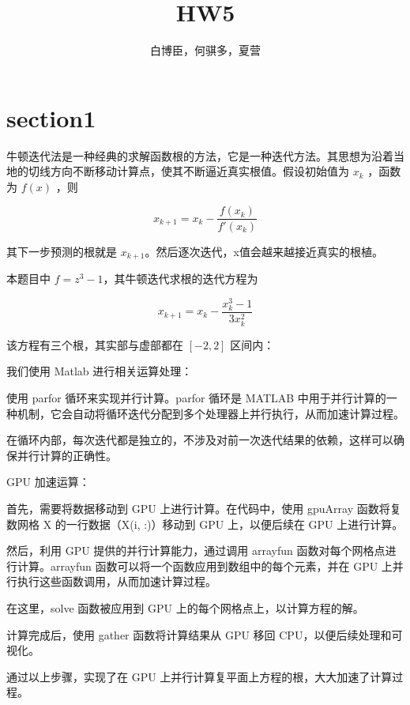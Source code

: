 \documentclass[UTF8]{ctexart}
\begin{document}
    \title{\textbf{HW5}}
    \author{白博臣，何骐多，夏营}
    \date{}
    \maketitle

    \section{section1}\label{sec:section1}
    牛顿迭代法是一种经典的求解函数根的方法，它是一种迭代方法。其思想为沿着当地的切线方向不断移动计算点，使其不断逼近真实根值。假设初始值为 \(x_k\) ，函数为 \(f(x)\) ，则

    \begin{equation*}
        x_{k+1}=x_k-\frac{f(x_k)}{f'(x_k)}\label{eq:equation1.1}
    \end{equation*}

    其下一步预测的根就是 \(x_{k+1}\)。然后逐次迭代，x值会越来越接近真实的根植。

    本题目中 \(f = z^3-1\)，其牛顿迭代求根的迭代方程为

    \begin{equation*}
        x_{k+1}=x_k-\frac{x_k^3-1}{3x_k^2}\label{eq:equation1.2}
    \end{equation*}

    该方程有三个根，其实部与虚部都在 \([-2,2]\) 区间内：

    我们使用 Matlab 进行相关运算处理：

    使用 parfor 循环来实现并行计算。parfor 循环是 MATLAB 中用于并行计算的一种机制，它会自动将循环迭代分配到多个处理器上并行执行，从而加速计算过程。

    在循环内部，每次迭代都是独立的，不涉及对前一次迭代结果的依赖，这样可以确保并行计算的正确性。

    GPU 加速运算：

    首先，需要将数据移动到 GPU 上进行计算。在代码中，使用 gpuArray 函数将复数网格 X 的一行数据（X(i, :)）移动到 GPU 上，以便后续在 GPU 上进行计算。

    然后，利用 GPU 提供的并行计算能力，通过调用 arrayfun 函数对每个网格点进行计算。arrayfun 函数可以将一个函数应用到数组中的每个元素，并在 GPU 上并行执行这些函数调用，从而加速计算过程。

    在这里，solve 函数被应用到 GPU 上的每个网格点上，以计算方程的解。

    计算完成后，使用 gather 函数将计算结果从 GPU 移回 CPU，以便后续处理和可视化。

    通过以上步骤，实现了在 GPU 上并行计算复平面上方程的根，大大加速了计算过程。
\end{document}
